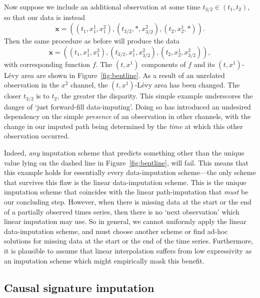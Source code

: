 \documentclass{article}
\begin{document}
Now suppose we include an additional observation at some time $t_{3/2} \in (t_1, t_2)$, so that our data is instead
%
\begin{equation}\label{eq:flaw2}
    \mathbf{x} = ((t_1, x_1^1, x_1^2), (t_{3/2}, *, x_{3/2}^2), (t_2, x_2^1, *)).
\end{equation}
%
Then the same procedure as before will produce the data
%
\begin{equation*}
    \mathbf{x} = ((t_1, x_1^1, x_1^2), (t_{3/2}, x_1^1, x_{3/2}^2), (t_2, x_2^1, x_{3/2}^2)),
\end{equation*}
%
with corresponding function $f$. The $(t, x^1)$ components of $f$ and
its $(t, x^1)$-L{\'e}vy area are shown in Figure~\ref{fig:bentline}. As
a result of an unrelated observation in the $x^2$ channel, the $(t,
x^1)$-L{\'e}vy area has been changed.
%
The closer $t_{3/2}$ is to $t_2$, the greater the disparity.
%
This simple example underscores the danger of `just forward-fill
data-imputing'. Doing so has introduced an undesired dependency on the
simple \emph{presence} of an observation in other channels, with the
change in our imputed path being determined by the \emph{time} at which
this other observation occurred.

Indeed, \emph{any} imputation scheme that predicts something other than
the unique value lying on the dashed line in Figure~\ref{fig:bentline},
will fail. This means that this example holds for essentially every
data-imputation scheme---the only scheme that survives this flaw is the
linear data-imputation scheme. This is the unique imputation scheme
that coincides with the linear path-imputation that \emph{must} be our
concluding step.
%
However, when there is missing data at the start or the end of
a partially observed times series, then there is no `next observation'
which linear imputation may use. So in general, we cannot uniformly
apply the linear data-imputation scheme, and must choose another scheme or find ad-hoc solutions for missing data at the start or the end of the time series. Furthermore, it is plausible to assume that linear interpolation suffers from low expressivity as an imputation scheme which might empirically mask this benefit.

\subsection{Causal signature imputation}\label{sec:Causal signature imputation}
\end{document}
